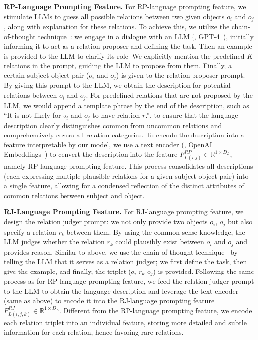 \noindent \textbf{RP-Language Prompting Feature.}
For RP-language prompting feature, we stimulate LLMs to guess all possible relations between two given objects $o_i$ and $o_j$, along with explanation for these relations.
To achieve this, we utilize the chain-of-thought technique~\citep{wei2022chain}: we engage in a dialogue with an LLM (\eg, GPT-4~\citep{chatgpt}), initially informing it to act as a relation proposer and defining the task.
Then an example is provided to the LLM to clarify its role.
We explicitly mention the predefined $K$ relations in the prompt, guiding the LLM to propose from them.
Finally, a certain subject-object pair ($o_i$ and $o_j$) is given to the relation proposer prompt.
By giving this prompt to the LLM, we obtain the description for potential relations between $o_i$ and $o_j$.
For predefined relations that are not proposed by the LLM, we would append a template phrase by the end of the description, such as ``It is not likely for $o_i$ and $o_j$ to have relation $r$.'', to ensure that the language description clearly distinguishes common from uncommon relations and comprehensively covers all relation categories.
To encode the description into a feature interpretable by our model, we use a text encoder (\eg, OpenAI Embeddings~\citep{chatgpt}) to convert the description into the feature $F_{L(i, j)}^{RP} \in \mathbb{R}^{1 \times D_{L}}$, namely RP-language prompting feature.
This process consolidates all descriptions (each expressing multiple plausible relations for a given subject-object pair) into a single feature, allowing for a condensed reflection of the distinct attributes of common relations between subject and object.

\noindent \textbf{RJ-Language Prompting Feature.}
For RJ-language prompting feature, we design the relation judger prompt: 
we not only provide two objects $o_i$, $o_j$ but also specify a relation $r_{k}$ between them. 
By using the common sense knowledge, the LLM judges whether the relation $r_{k}$ could plausibly exist between $o_i$ and $o_j$ and provides reason.
Similar to above, we use the chain-of-thought technique~\citep{wei2022chain} by telling the LLM that it serves as a relation judger; we first define the task, then give the example, and finally, the triplet ($o_i\text{-}r_{k}\text{-}o_j$) is provided.
Following the same process as for RP-language prompting feature, we feed the relation judger prompt to the LLM to obtain the language description and leverage the text encoder (same as above) to encode it into the RJ-language prompting feature $F_{L(i, j, k)}^{RJ} \in \mathbb{R}^{1 \times D_{L}}$. Different from the RP-language prompting feature, we encode each relation triplet into an individual feature, storing more detailed and subtle information for each relation, hence favoring rare relations.

